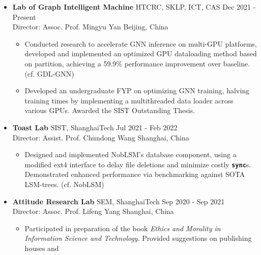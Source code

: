 \documentclass[a4paper,10pt]{ctexart} %
\begin{document}
    \begin{itemize}
        \item \textbf{Lab of Graph Intelligent Machine} \quad HTCRC, SKLP, ICT, CAS \hfill Dec 2021 - Present \\
        {\small Director: Assoc. Prof. Mingyu Yan} \hfill Beijing, China
        \begin{small}
            \begin{itemize}
                \item Conducted research to accelerate GNN inference on multi-GPU platforms, developed and implemented an optimized GPU dataloading method based on partition, achieving a 59.9\% performance improvement over baseline. (cf. GDL-GNN)
                \item Developed an undergraduate FYP on optimizing GNN training, halving training times by implementing a multithreaded data loader across various GPUs. Awarded the SIST Outstanding Thesis.
            \end{itemize}
        \end{small}

        \item \textbf{Toast Lab} \quad SIST, ShanghaiTech \hfill Jul 2021 - Feb 2022 \\
        {\small Director: Assist. Prof. Chundong Wang} \hfill Shanghai, China
        \begin{small}
            \begin{itemize}
                \item Designed and implemented NobLSM's database component, using a modified ext4 interface to delay file deletions and minimize costly \textbf{\texttt{sync}}s. Demonstrated enhanced performance via benchmarking against SOTA LSM-trees. (cf. NobLSM)
            \end{itemize}
        \end{small}

        \item \textbf{Attitude Research Lab} \quad SEM, ShanghaiTech \hfill Sep 2020 - Sep 2021 \\
        {\small Director: Assoc. Prof. Lifeng Yang} \hfill Shanghai, China
        \begin{small}
            \begin{itemize}
                \item Participated in preparation of the book \textit{Ethics and Morality in Information Science and Technology}. Provided suggestions on publishing houses and 
            \end{itemize}
        \end{small}
    \end{itemize}
\end{document}
